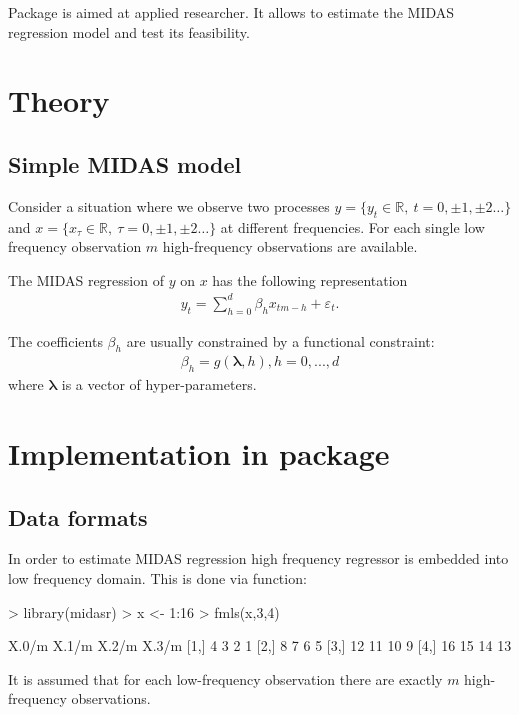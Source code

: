 \documentclass[nojss]{jss}
\begin{document}
Package  is aimed at applied researcher. It allows to
estimate the MIDAS regression model and test its feasibility.


\section{Theory}

\subsection{Simple MIDAS model}

Consider a situation where we observe two processes $y=\{y_t\in
\mathbb{R}, \ t=0,\pm 1,\pm 2\dots\}$  and $x=\{x_\tau\in \mathbb
  {R}, \ \tau=0, \pm 1, \pm2 \dots\}$ at different frequencies. For
each single low frequency observation $m$ high-frequency observations
are available. 

The MIDAS regression of $y$ on $x$ has the following representation
\begin{align} \label{eq:1}
  y_t=\sum_{h=0}^{d}\beta_hx_{tm-h}+\varepsilon_t. 
\end{align}

The coefficients $\beta_h$ are usually constrained by a functional constraint:
\begin{align*}
  \beta_h=g(\bm{\lambda},h), h=0,...,d
\end{align*}
where $\bm{\lambda}$ is a vector of hyper-parameters.


\section[Implementation in midasr package]{Implementation in  package}

\subsection{Data formats}

In order to estimate MIDAS regression high frequency regressor is
embedded into low frequency domain. This is done via 
function: 
\begin{Schunk}
\begin{Sinput}
> library(midasr)
> x <- 1:16
> fmls(x,3,4)
\end{Sinput}
\begin{Soutput}
     X.0/m X.1/m X.2/m X.3/m
[1,]     4     3     2     1
[2,]     8     7     6     5
[3,]    12    11    10     9
[4,]    16    15    14    13
\end{Soutput}
\end{Schunk}
It is assumed that for each low-frequency observation there are
exactly $m$ high-frequency observations.
\end{document}
